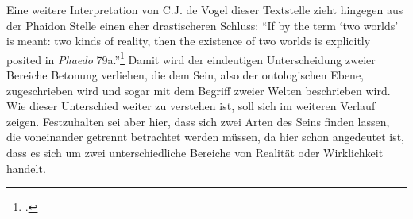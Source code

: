 Eine weitere Interpretation von C.J. de Vogel dieser Textstelle zieht hingegen aus der Phaidon Stelle einen eher drastischeren Schluss:
\enquote{If by the term \enquote{two worlds} is meant: two kinds of reality, then the existence of two worlds is explicitly posited in \emph{Phaedo} 79a.}\footcite[][S. 161]{Vogel}
Damit wird der eindeutigen Unterscheidung zweier Bereiche Betonung verliehen, die dem Sein, also der ontologischen Ebene, zugeschrieben wird und sogar mit dem Begriff zweier Welten beschrieben wird. Wie dieser Unterschied weiter zu verstehen ist, soll sich im weiteren Verlauf zeigen. Festzuhalten sei aber hier, dass sich zwei Arten des Seins finden lassen, die voneinander getrennt betrachtet werden müssen, da hier schon angedeutet ist, dass es sich um zwei unterschiedliche Bereiche von Realität oder Wirklichkeit handelt.

